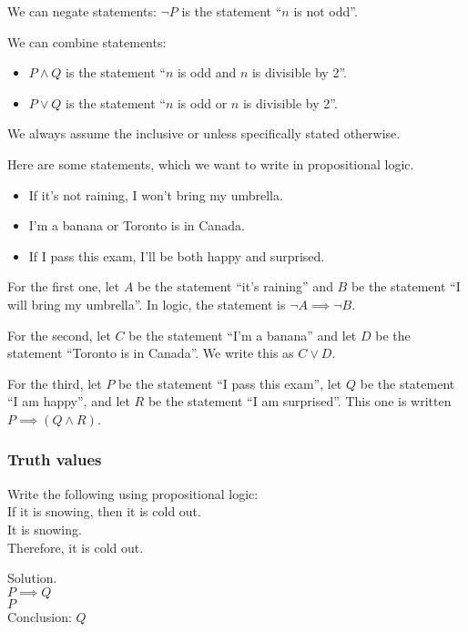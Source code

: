 \documentclass{article}
\begin{document}
\vspace{1em}

We can  negate statements: $\neg P$ is the statement ``$n$ is not odd''.

\vspace{1em}
 We can combine statements: 
 \begin{itemize}
 \item $P \wedge Q$ is the statement ``$n$ is odd and $n$ is divisible by 2''.
 \item $P \vee Q$ is the statement ``$n$ is odd or $n$ is divisible by 2''.
\end{itemize}
We always assume the inclusive or unless specifically stated otherwise.


\begin{example}
Here are some statements, which we want to write in propositional logic.
\begin{itemize}
              \item If it's not raining, I won't bring my umbrella.
              \item I'm a banana or Toronto is in Canada.
              \item If I pass this exam, I'll be both happy and surprised.
\end{itemize}

For the first one, let $A$ be the statement ``it's raining'' and $B$ be the statement ``I will bring my umbrella''. In logic, the statement is $\neg A \implies \neg B$.

\vspace{1em}

For the second, let $C$ be the statement ``I'm a banana'' and let $D$ be the statement ``Toronto is in Canada''. We write this as $C \vee D$.

\vspace{1em}

For the third, let $P$ be the statement ``I pass this exam'', let $Q$ be the statement ``I am happy'', and let $R$ be the statement ``I am surprised''. This one is written $P \implies (Q \wedge R)$.
\end{example}

\subsubsection{Truth values}

\begin{example} Write the following using propositional logic: \\
If it is snowing, then it is cold out. \\
It is snowing. \\
Therefore, it is cold out.

\vspace{1em}

Solution. \\
$P \implies Q$ \\
$P$ \\
Conclusion: $Q$ \\
\end{example}
\end{document}
